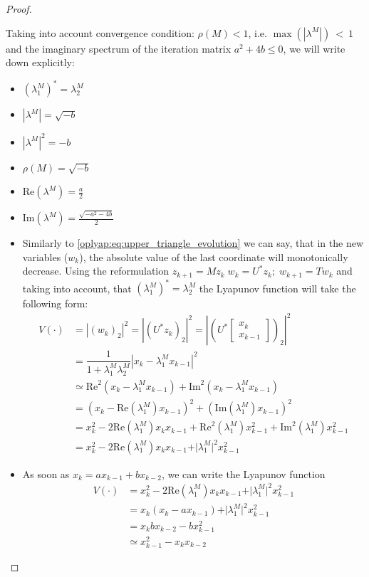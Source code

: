 \documentclass[a4paper,11pt]{article}
\begin{document}
\begin{proof}
\begin{enumerate}
 Taking into account convergence condition: $\rho(M) < 1$, i.e. $\max\left(|\lambda^M|\right)~<~1$ and the imaginary spectrum of the iteration matrix $a^2 + 4b \leq 0$, we will write down explicitly:
 \begin{itemize}
 \item $\left(\lambda^M_1\right)^* = \lambda^M_2$
 \item $|\lambda^M| = \sqrt{-b}$
 \item $|\lambda^M|^2 = -b$
 \item $\rho(M) = \sqrt{-b}$
 \item $\text{Re}(\lambda^M) = \frac{a}{2}$
 \item $\text{Im}(\lambda^M) = \frac{\sqrt{-a^2 - 4b}}{2}$
 \item Similarly to \eqref{oplyap:eq:upper_triangle_evolution} we can say, that in the new variables ($w_k$), the absolute value of the last coordinate will monotonically decrease. Using the reformulation $z_{k+1} = M z_k \; w_k = U^* z_k; \; w_{k+1} = T w_k$ and taking into account, that $\left(\lambda_1^M\right)^* = \lambda_2^M$ the Lyapunov function will take the following form:
 \begin{equation}
 \begin{split}
 V(\cdot) &= | (w_{k})_2|^2 = | (U^* z_{k})_2|^2 = \left\vert \left(U^*\begin{bmatrix} x_k \\ x_{k-1} \end{bmatrix}\right)_2 \right\vert^2 \\
 &=\dfrac{1}{1 + \lambda^M_1\lambda^M_2} \left\vert x_k - \lambda^M_1 x_{k-1}\right\vert^2 \\
 &\simeq \text{Re}^2(x_k - \lambda^M_1 x_{k-1}) + \text{Im}^2(x_k - \lambda^M_1x_{k-1}) \\
 &= \left(x_k - \text{Re}(\lambda^M_1) x_{k-1}\right)^2 + \left(\text{Im}( \lambda^M_1) x_{k-1}\right) ^2 \\
 &= x_k^2 - 2 \text{Re}(\lambda^M_1) x_k x_{k-1} + \text{Re}^2(\lambda^M_1)x_{k-1}^2 + \text{Im}^2( \lambda^M_1) x_{k-1}^2 \\
 &= x_k^2 - 2 \text{Re}(\lambda^M_1) x_k x_{k-1} + \vert \lambda^M_1\vert^2 x_{k-1}^2
 \end{split}
 \end{equation}
 \item As soon as $x_k = a x_{k-1} + b x_{k-2}$, we can write the Lyapunov function \begin{equation}
 \begin{split}
 V(\cdot) &= x_k^2 - 2 \text{Re}(\lambda^M_1) x_k x_{k-1} + \vert \lambda^M_1\vert^2 x_{k-1}^2 \\
 &= x_k \left( x_k - a x_{k-1}\right) + \vert \lambda^M_1\vert^2 x_{k-1}^2\\
 &= x_k b x_{k-2} -b x_{k-1}^2 \\
 &\simeq x_{k-1}^2 - x_k x_{k-2}
 \end{split}
 \end{equation}


\end{itemize}
\end{enumerate}
\end{proof}
\end{document}
